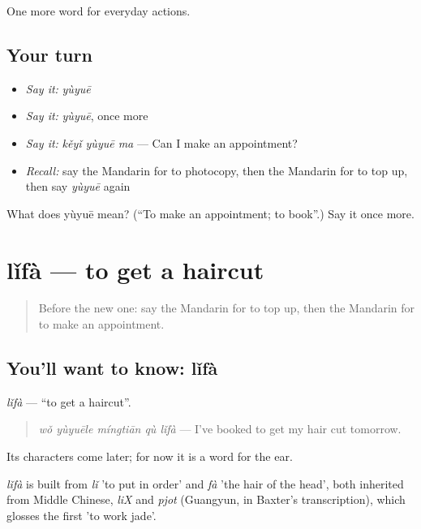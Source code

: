 \begin{grammarlens}[title={What you've built}]
One more word for everyday actions.
\end{grammarlens}

\subsection*{Your turn}
\begin{itemize}
\raggedright
  \item \emph{Say it:} \emph{yùyuē}
  \item \emph{Say it:} \emph{yùyuē}, once more
  \item \emph{Say it:} \emph{kěyǐ yùyuē ma} — Can I make an appointment?
  \item \emph{Recall:} say the Mandarin for to photocopy, then the Mandarin for to top up, then say \emph{yùyuē} again
\end{itemize}

\begin{tcolorbox}[breakable,colback=teal!4,colframe=teal!35!black,title={Before you move on}]
What does yùyuē mean? (\textquotedblleft{}To make an appointment; to book\textquotedblright{}.) Say it once more.
\end{tcolorbox}
\section[lǐfà]{lǐfà — to get a haircut}

\label{lesson:ZH-C212-lifa}



\begin{quote}
Before the new one: say the Mandarin for to top up, then the Mandarin for to make an appointment.
\end{quote}

\subsection*{You'll want to know: lǐfà}
\emph{lǐfà} — \textquotedblleft{}to get a haircut\textquotedblright{}.

\begin{quote}
\emph{wǒ yùyuēle míngtiān qù lǐfà} — I've booked to get my hair cut tomorrow.
\end{quote}

Its characters come later; for now it is a word for the ear.

\begin{cousinweb}
\emph{lǐfà} is built from \emph{lǐ} 'to put in order' and \emph{fà} 'the hair of the head', both inherited from Middle Chinese, \emph{liX} and \emph{pjot} (Guangyun, in Baxter's transcription), which glosses the first 'to work jade'.
\end{cousinweb}

